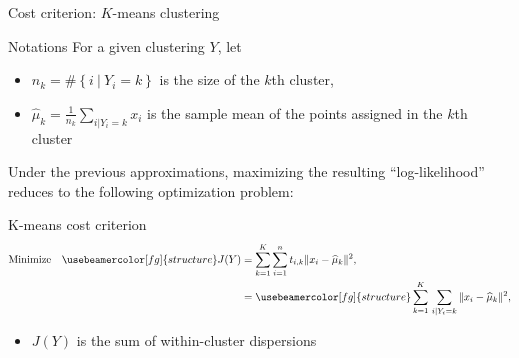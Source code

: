 \documentclass[compress, smaller, serif, 9pt]{beamer}
\newcommand{\structuretext}[1]{{\usebeamercolor[fg]{structure} #1}}
\newcommand{\doigt}{\structuretext{\noindent \Pisymbol{pzd}{43}}}
\begin{document}
\begin{frame}{Cost criterion: $K$-means clustering}

\begin{block}{Notations}
 For a given clustering $Y$, let 
 \begin{itemize}
  \item $n_k = \#\left\{ i\ | \ Y_i=k  \right\}$ is the size of the $k$th cluster,
  \item $\widehat{\mu}_k= \frac{1}{n_k} \sum_{i|Y_i=k} x_i$ is the sample mean of the points assigned in the $k$th cluster
 \end{itemize}
\end{block}



Under the previous approximations, maximizing the resulting ``log-likelihood'' reduces to the following 
optimization problem: 
\begin{block}{K-means cost criterion} \vspace{-3mm}
\begin{align*}
\textrm{Minimize} \quad  \structuretext{J(Y)} &= \sum_{k=1}^K \sum_{i=1}^n t_{i,k} \| x_i-\widehat{\mu}_k \|^2,\\
 &= \structuretext{ \sum_{k=1}^K \, \sum_{i|Y_i=k}  \| x_i-\widehat{\mu}_k \|^2},
\end{align*}


\begin{itemize}
 \item[\doigt] $J(Y)$ is the sum of \structuretext{within-cluster} dispersions
\end{itemize}
\end{block}
\end{frame}


% 
% 
\end{document}
